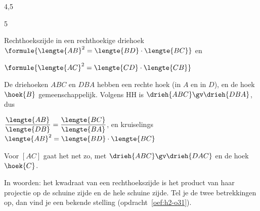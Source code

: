 \begin{alleenvoor}{4,5}
\begin{alleenvoor}{5}
\begin{theorie}
\begin{minipage}[t]{.62\linewidth}
\begin{stelling}{Rechthoekszijde in een rechthoekige driehoek}
\vspace{1mm}
\qquad $\formule{\lengte{AB}^2 = \lengte{BD} \cdot \lengte{BC}}$ \quad en

\vspace{1mm}
\qquad $\formule{\lengte{AC}^2 = \lengte{CD} \cdot \lengte{CB}}$
\end{stelling}

\begin{bewijs}
De driehoeken $ABC$ en $DBA$ hebben een rechte hoek (in $A$ en in $D$), en de hoek $\hoek{B}$ gemeenschappelijk. Volgens HH is $\drieh{ABC} \gv \drieh{DBA}$, dus

\vspace{1mm}
\qquad $\dfrac{\lengte{AB}}{\lengte{DB}} = \dfrac{\lengte{BC}}{\lengte{BA}}$, \quad en kruiselings $\lengte{AB}^2 = \lengte{BD} \cdot \lengte{BC}$

\vspace{1mm}
Voor $[AC]$ gaat het net zo, met $\drieh{ABC} \gv \drieh{DAC}$ en de hoek $\hoek{C}$.
\end{bewijs}
\end{minipage}\hfill
\begin{minipage}[t]{.34\linewidth}
\vspace{0pt}
\centering
{}
\end{minipage}
\end{theorie}

In woorden: het kwadraat van een rechthoekszijde is het product van haar projectie op de schuine zijde en de hele schuine zijde. Tel je de twee betrekkingen op, dan vind je een bekende stelling (opdracht~\ref{oef:h2-o31}).


\end{alleenvoor}
\end{alleenvoor}
